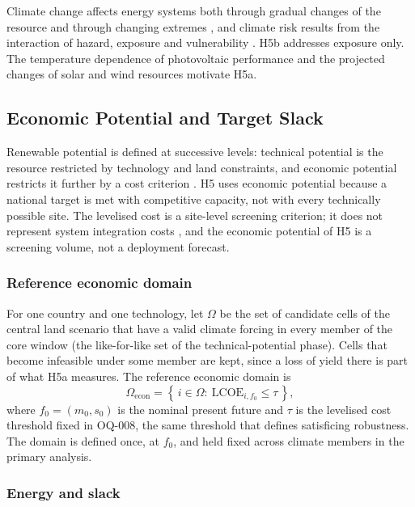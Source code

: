 Climate change affects energy systems both through gradual changes of the
resource and through changing extremes \cite{iaea2019}, and climate risk results
from the interaction of hazard, exposure and vulnerability
\cite{ipcc2022wgii}. H5b addresses exposure only. The temperature dependence of
photovoltaic performance \cite{skoplaki2009} and the projected changes of solar
and wind resources \cite{jerez2015,pryorbarthelmie2010} motivate H5a.

\subsection{Economic Potential and Target Slack}
\label{subsec:h5_slack}

Renewable potential is defined at successive levels: technical potential is the
resource restricted by technology and land constraints, and economic potential
restricts it further by a cost criterion \cite{mercure2012,brown2015}. H5 uses
economic potential because a national target is met with competitive capacity,
not with every technically possible site. The levelised cost is a site-level
screening criterion; it does not represent system integration costs
\cite{ueckerdt2013}, and the economic potential of H5 is a screening volume, not
a deployment forecast.

\subsubsection{Reference economic domain}

For one country and one technology, let $\Omega$ be the set of candidate cells of
the central land scenario that have a valid climate forcing in every member of
the core window (the like-for-like set of the technical-potential phase). Cells
that become infeasible under some member are kept, since a loss of yield there is
part of what H5a measures. The reference economic domain is
\begin{equation}
    \Omega_{\mathrm{econ}}=\left\{\,i\in\Omega:\ \mathrm{LCOE}_{i,f_0}\leq\tau\,\right\},
    \label{eq:h5_domain}
\end{equation}
where $f_0=(m_0,s_0)$ is the nominal present future and $\tau$ is the levelised
cost threshold fixed in OQ-008, the same threshold that defines satisficing
robustness. The domain is defined once, at $f_0$, and held fixed across climate
members in the primary analysis.

\subsubsection{Energy and slack}

